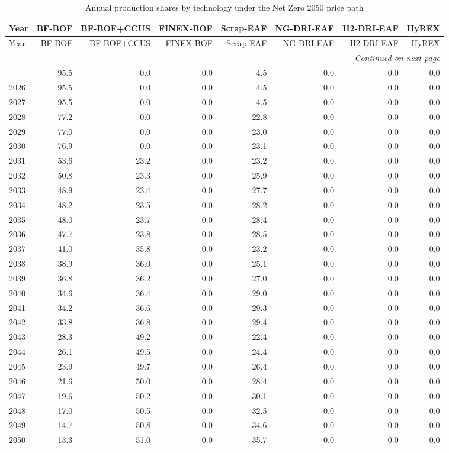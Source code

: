 \begin{longtable}{@{}lrrrrrrr@{}}
\caption{Annual production shares by technology under the Net Zero 2050 price path}
\label{tab:annual-shares-ngfs_netzero2050}
\toprule
Year & BF-BOF & BF-BOF+CCUS & FINEX-BOF & Scrap-EAF & NG-DRI-EAF & H2-DRI-EAF & HyREX \\
\midrule
\endfirsthead
\toprule
Year & BF-BOF & BF-BOF+CCUS & FINEX-BOF & Scrap-EAF & NG-DRI-EAF & H2-DRI-EAF & HyREX \\
\midrule
\endhead
\bottomrule \multicolumn{8}{r}{\textit{Continued on next page}} \\
\endfoot
\bottomrule
\endlastfoot
2025 & 95.5 & 0.0 & 0.0 & 4.5 & 0.0 & 0.0 & 0.0 \\
2026 & 95.5 & 0.0 & 0.0 & 4.5 & 0.0 & 0.0 & 0.0 \\
2027 & 95.5 & 0.0 & 0.0 & 4.5 & 0.0 & 0.0 & 0.0 \\
2028 & 77.2 & 0.0 & 0.0 & 22.8 & 0.0 & 0.0 & 0.0 \\
2029 & 77.0 & 0.0 & 0.0 & 23.0 & 0.0 & 0.0 & 0.0 \\
2030 & 76.9 & 0.0 & 0.0 & 23.1 & 0.0 & 0.0 & 0.0 \\
2031 & 53.6 & 23.2 & 0.0 & 23.2 & 0.0 & 0.0 & 0.0 \\
2032 & 50.8 & 23.3 & 0.0 & 25.9 & 0.0 & 0.0 & 0.0 \\
2033 & 48.9 & 23.4 & 0.0 & 27.7 & 0.0 & 0.0 & 0.0 \\
2034 & 48.2 & 23.5 & 0.0 & 28.2 & 0.0 & 0.0 & 0.0 \\
2035 & 48.0 & 23.7 & 0.0 & 28.4 & 0.0 & 0.0 & 0.0 \\
2036 & 47.7 & 23.8 & 0.0 & 28.5 & 0.0 & 0.0 & 0.0 \\
2037 & 41.0 & 35.8 & 0.0 & 23.2 & 0.0 & 0.0 & 0.0 \\
2038 & 38.9 & 36.0 & 0.0 & 25.1 & 0.0 & 0.0 & 0.0 \\
2039 & 36.8 & 36.2 & 0.0 & 27.0 & 0.0 & 0.0 & 0.0 \\
2040 & 34.6 & 36.4 & 0.0 & 29.0 & 0.0 & 0.0 & 0.0 \\
2041 & 34.2 & 36.6 & 0.0 & 29.3 & 0.0 & 0.0 & 0.0 \\
2042 & 33.8 & 36.8 & 0.0 & 29.4 & 0.0 & 0.0 & 0.0 \\
2043 & 28.3 & 49.2 & 0.0 & 22.4 & 0.0 & 0.0 & 0.0 \\
2044 & 26.1 & 49.5 & 0.0 & 24.4 & 0.0 & 0.0 & 0.0 \\
2045 & 23.9 & 49.7 & 0.0 & 26.4 & 0.0 & 0.0 & 0.0 \\
2046 & 21.6 & 50.0 & 0.0 & 28.4 & 0.0 & 0.0 & 0.0 \\
2047 & 19.6 & 50.2 & 0.0 & 30.1 & 0.0 & 0.0 & 0.0 \\
2048 & 17.0 & 50.5 & 0.0 & 32.5 & 0.0 & 0.0 & 0.0 \\
2049 & 14.7 & 50.8 & 0.0 & 34.6 & 0.0 & 0.0 & 0.0 \\
2050 & 13.3 & 51.0 & 0.0 & 35.7 & 0.0 & 0.0 & 0.0 \\
\end{longtable}

